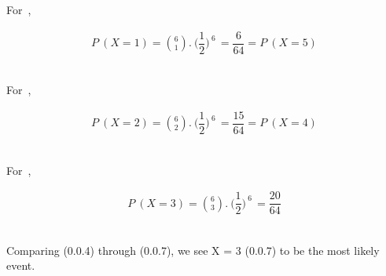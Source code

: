 \documentclass[journal,12pt,twocolumn]{IEEEtran}
\begin{document}
\begin{flushleft}For\ ,\end{flushleft}
\begin{align}P\ (X = 1) = \binom{6}{1}.\ \Big(\dfrac{1}{2}\Big)^{\ 6\ } = \dfrac{6}{64} = P\ (X = 5)\end{align}\\

\begin{flushleft}For\ ,\end{flushleft}
\begin{align}P\ (X = 2) = \binom{6}{2}.\ \Big(\dfrac{1}{2}\Big)^{\ 6\ } = \dfrac{15}{64} = P\ (X = 4)\end{align}\\

\begin{flushleft}For\ ,\end{flushleft}
\begin{align}P\ (X = 3) = \binom{6}{3}.\ \Big(\dfrac{1}{2}\Big)^{\ 6\ } = \dfrac{20}{64}\end{align}
\\
\begin{flushleft}Comparing (0.0.4) through (0.0.7), we see X = 3 (0.0.7) to be the most likely event.\end{flushleft}
\end{document}
